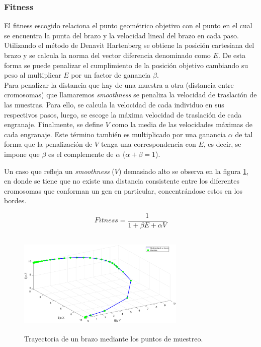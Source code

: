 \documentclass[12pt]{article}
\begin{document}
\subsubsection{Fitness}
El fitness escogido relaciona el punto geométrico objetivo con el punto en el cual se encuentra la punta del brazo y la velocidad lineal del brazo en cada paso. Utilizando el método de Denavit Hartenberg se obtiene la posición cartesiana del brazo y se calcula la norma del vector diferencia denominado como $E$. De esta forma se puede penalizar el cumplimiento de la posición objetivo cambiando su peso al multiplicar $E$ por un factor de ganancia $\beta$.\\
Para penalizar la distancia que hay de una muestra a otra (distancia entre cromosomas) que llamaremos \textit{smoothness} se penaliza la velocidad de traslación de las muestras. Para ello, se calcula la velocidad de cada individuo en sus respectivos pasos, luego, se escoge la máxima velocidad de traslación de cada engranaje. Finalmente, se define $V$ como la media de las velocidades máximas de cada engranaje. Este término también es multiplicado por una ganancia $\alpha$ de tal forma que la penalización de $V$ tenga una correspondencia con $E$, es decir, se impone que $\beta$ es el complemente de $\alpha$ ($\alpha + \beta = 1$).

Un caso que refleja un \textit{smoothness} ($V$) demasiado alto se observa en la figura \ref{smoothness}, en donde se tiene que no existe una distancia consistente entre los diferentes cromosomas que conforman un gen en particular, concentrándose estos en los bordes.

\begin{equation}
    Fitness = \frac{1}{1 + \beta E + \alpha V}
    \label{fitness}
\end{equation}

\begin{figure}
\centering
\includegraphics[width=8cm,height=5cm]{imag/EjemploSmoothness.eps}
\caption{Trayectoria de un brazo mediante los puntos de muestreo.}
\label{smoothness}
\end{figure}
\end{document}
